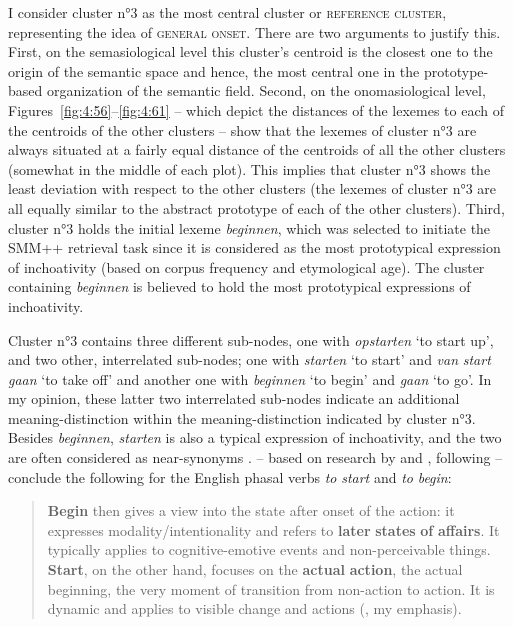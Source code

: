 I consider cluster n°3 as the most central cluster or \textsc{reference cluster}, representing the idea of \textsc{general onset}. There are two arguments to justify this. First, on the semasiological level this cluster’s centroid is the closest one to the origin of the semantic space and hence, the most central one in the prototype-based organization of the semantic field. Second, on the onomasiological level, Figures~\ref{fig:4:56}--\ref{fig:4:61} – which depict the distances of the lexemes to each of the centroids of the other clusters – show that the lexemes of cluster n°3 are always situated at a fairly equal distance of the centroids of all the other clusters (somewhat in the middle of each plot). This implies that cluster n°3 shows the least deviation with respect to the other clusters (the lexemes of cluster n°3 are all equally similar to the abstract prototype of each of the other clusters). Third, cluster n°3 holds the initial lexeme \textit{beginnen}, which was selected to initiate the SMM++ retrieval task since it is considered as the most prototypical expression of inchoativity (based on corpus frequency and etymological age). The cluster containing \textit{beginnen} is believed to hold the most prototypical expressions of inchoativity.

Cluster n°3 contains three different sub-nodes, one with \textit{opstarten} `to start up', and two other, interrelated sub-nodes; one with \textit{starten} `to start' and \textit{van} \textit{start} \textit{gaan} `to take off' and another one with \textit{beginnen} `to begin' and \textit{gaan} `to go'. In my opinion, these latter two interrelated sub-nodes indicate an additional meaning-distinction within the meaning-distinction indicated by cluster n°3. Besides \textit{beginnen}, \textit{starten} is also a typical expression of inchoativity, and the two are often considered as near-synonyms \citep[223]{schmid_introspection_1996}. \citet{lewandowska-tomasczyk_corpus-based_2009} – based on research by \citet{biber_longman_1999} and \citet{schmid_cottage_1993}, following \citet{quirk_comprehensive_1985} – conclude the following for the English phasal verbs \textit{to} \textit{start} and \textit{to} \textit{begin}:

\begin{quote}
\textbf{Begin} then gives a view into the state after onset of the action: it expresses modality\slash intentionality and refers to \textbf{later} \textbf{states} \textbf{of} \textbf{affairs}. It typically applies to cognitive-emotive events and non-perceivable things. \textbf{Start}, on the other hand, focuses on the \textbf{actual} \textbf{action}, the actual beginning, the very moment of transition from non-action to action. It is dynamic and applies to visible change and actions (\citealt[279]{lewandowska-tomasczyk_corpus-based_2009}, my emphasis).
\end{quote}

